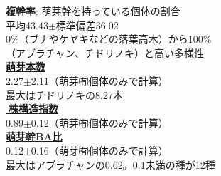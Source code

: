 \documentclass[a0, 30pt, plainboxedsections, draft]{sciposter} %
\renewcommand{\baselinestretch}{1.2}
\begin{document}
\begin{multicols}{2}

\begin{mdframed}[style=subsection.frame,frametitle={\textbf{\huge{\ding{192}}\LARGE{25種の株構造は種間で大きく異なる}}}]
\renewcommand{\baselinestretch}{1.2}

\begin{figure}
 \begin{minipage}{0.5\hsize}
\textbf{\underline{複幹率}}{\footnotesize: 萌芽幹を持っている個体の割合}\\平均43.43$\pm$標準偏差36.02\\
{\scriptsize 0\%（ブナやケヤキなどの落葉高木）から100\%\\（アブラチャン、チドリノキ）と高い多様性}\\
\textbf{\underline{萌芽本数}}\\2.27$\pm$2.11{\footnotesize（萌芽㈲個体のみで計算）}\\
{\scriptsize 最大はチドリノキの8.27本}\\
\textbf{\underline{株構造指数}}\\0.89$\pm$0.12{\footnotesize（萌芽㈲個体のみで計算）}\\
\textbf{\underline{萌芽幹BA比}}\\0.12$\pm$0.16{\footnotesize（萌芽㈲個体のみで計算）}\\
{\scriptsize 最大はアブラチャンの0.62。0.1未満の種が12種}


\end{minipage}
\end{figure}
\end{mdframed}
\end{multicols}
\end{document}
